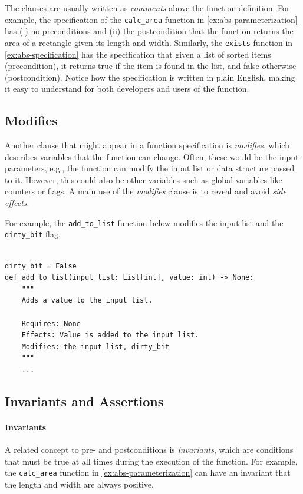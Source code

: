 \documentclass[oneside,11pt,dvipsnames]{book}
\newcommand{\code}[1]{\texttt{#1}}
\begin{document}
The clauses are usually written as \emph{comments} above the function definition. For example, the specification of the \code{calc\_area} function in \autoref{ex:abs-parameterization} has (i) no preconditions and (ii) the postcondition that the function returns the area of a rectangle given its length and width.  Similarly, the \code{exists} function in \autoref{ex:abs-specification} has the specification that given a list of sorted items (precondition), it returns true if the item is found in the list, and false otherwise (postcondition).  Notice how the specification is written in plain English, making it easy to understand for both developers and users of the function.


\subsection{Modifies} Another clause that might appear in a function specification is \emph{modifies}, which describes variables that the function can change. Often, these would be the input parameters, e.g., the function can modify the input list or data structure passed to it. However, this could also be other variables such as global variables like counters or flags.
A main use of the \emph{modifies} clause is to reveal and avoid \emph{side effects}.

For example, the \code{add\_to\_list} function below modifies the input list and the \code{dirty\_bit} flag.

\begin{lstlisting}

dirty_bit = False    
def add_to_list(input_list: List[int], value: int) -> None:
    """
    Adds a value to the input list.

    Requires: None
    Effects: Value is added to the input list.
    Modifies: the input list, dirty_bit
    """
    ...
\end{lstlisting}

\subsection{Invariants and Assertions}\label{sec:invariants}

\paragraph{Invariants} A related concept to pre- and postconditions is \emph{invariants}, which are conditions that must be true at all times during the execution of the function. For example, the \code{calc\_area} function in \autoref{ex:abs-parameterization} can have an invariant that the length and width are always positive.
\end{document}
